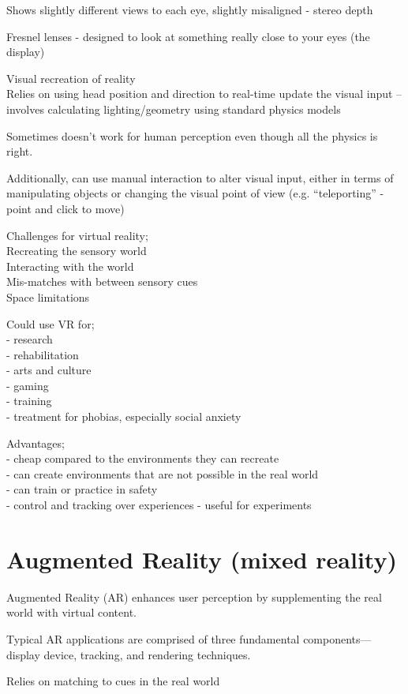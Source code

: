 \documentclass[]{project_plan}
\begin{document}
Shows slightly different views to each eye, slightly misaligned - stereo depth

Fresnel lenses - designed to look at something really close to your eyes (the display)

Visual recreation of reality\\
Relies on using head position and direction to real-time update the visual input – involves
calculating lighting/geometry using standard physics models

Sometimes doesn't work for human perception even though all the physics is right.

Additionally, can use manual interaction to alter visual input, either in terms of manipulating
objects or changing the visual point of view (e.g. “teleporting” - point and click to move)

Challenges for virtual reality;\\
Recreating the sensory world\\
Interacting with the world\\
Mis-matches with between sensory cues\\
Space limitations

Could use VR for;\\
- research\\
- rehabilitation\\
- arts and culture\\
- gaming\\
- training\\
- treatment for phobias, especially social anxiety

Advantages;\\
- cheap compared to the environments they can recreate\\
- can create environments that are not possible in the real world\\
- can train or practice in safety\\
- control and tracking over experiences - useful for experiments

\section{Augmented Reality (mixed reality)}
Augmented Reality (AR) enhances user perception by supplementing the real world with
virtual content.

Typical AR applications are comprised of three fundamental components—display device, tracking, and
rendering techniques.

Relies on matching to cues in the real world
\end{document}
